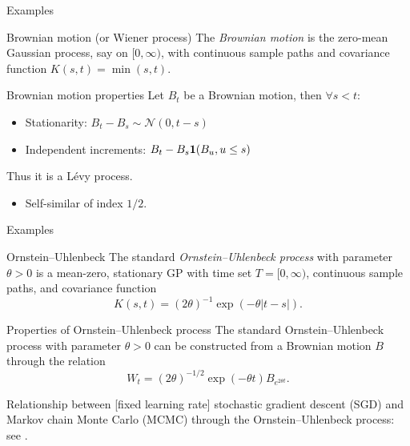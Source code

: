 \begin{frame}{Examples}

\begin{exampleblock}{Brownian motion (or Wiener process)}
	The \textit{Brownian motion} is the zero-mean Gaussian process, say on $[0,\infty)$, with continuous sample paths and covariance function $K(s,t)=\min(s,t)$.
\end{exampleblock}

\pause


\begin{alertblock}{Brownian motion properties}
	Let $B_t$ be a Brownian motion, then $\forall s< t$:
	\begin{itemize}
		\item \alert{Stationarity}:  $B_t-B_s\sim \mathcal{N}(0,t-s)$
		\item \alert{Independent increments}:  $B_t-B_s\mathbf 1 (B_u, u\leq s)$
	\end{itemize}
	Thus it is a L\'evy process.
	\begin{itemize}
		\item \alert{Self-similar} of index $1/2$.
	\end{itemize}
\end{alertblock}

\end{frame}


\begin{frame}{Examples}

\begin{exampleblock}{Ornstein--Uhlenbeck}
	The standard \textit{Ornstein--Uhlenbeck process} with parameter $\theta>0$ is a mean-zero, stationary GP with time set $T = [0, \infty)$, continuous sample paths, and covariance function
		$$K(s,t) = (2\theta)^{-1}\exp\left(-\theta|t-s|\right).$$
\end{exampleblock}

\pause

\begin{alertblock}{Properties of Ornstein--Uhlenbeck process}
	The standard Ornstein--Uhlenbeck process with parameter $\theta>0$ can be constructed from a Brownian motion $B$ through the relation 	
	$$W_t = (2\theta)^{-1/2}\exp\left(-\theta t\right)B_{e^{2\theta t}}.$$
\end{alertblock}

\pause

Relationship between [fixed learning rate] \alert{stochastic gradient descent} (SGD) and \alert{Markov chain Monte Carlo} (MCMC) through the Ornstein--Uhlenbeck process: see \citet{mandt2017stochastic}.


\end{frame}


